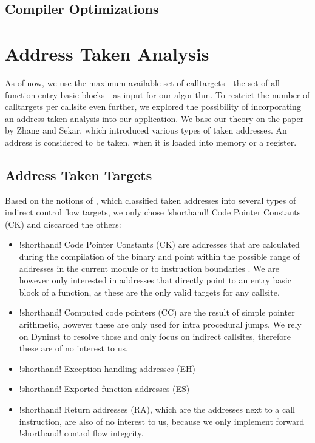 \subsection{Compiler Optimizations}
\label{subsection:compileroptimizations}

\section{Address Taken Analysis}
\label{section:addresstakenanalysis}

As of now, we use the maximum available set of calltargets - the set of all function entry basic blocks - as input for our algorithm. To restrict the number of calltargets per callsite even further, we explored the possibility of incorporating an address taken analysis into our application. We base our theory on the paper by Zhang and Sekar\cite{ZhangSekar00}, which introduced various types of taken addresses. An address is considered to be taken, when it is loaded into memory or a register.

\subsection{Address Taken Targets}
Based on the notions of \cite{ZhangSekar00}, which classified taken addresses into several types of indirect control flow targets, we only chose {!shorthand! Code Pointer Constants (CK)} and discarded the others:
\begin{itemize}

\item {!shorthand! Code Pointer Constants (CK)} are addresses that are calculated during the compilation of the binary and point within the possible range of addresses in the current module or to instruction boundaries \cite{ZhangSekar00}. We are however only interested in addresses that directly point to an entry basic block of a function, as these are the only valid targets for any callsite.

\item {!shorthand! Computed code pointers (CC)} are the result of simple pointer arithmetic, however these are only used for intra procedural jumps\cite{ZhangSekar00}. We rely on Dyninst to resolve those and only focus on indirect callsites, therefore these are of no interest to us.

\item{!shorthand! Exception handling addresses (EH)}

\item{!shorthand! Exported function addresses (ES)}

\item {!shorthand! Return addresses (RA)}, which are the addresses next to a call instruction, are also of no interest to us, because we only implement forward {!shorthand! control flow integrity}.
\end{itemize}

